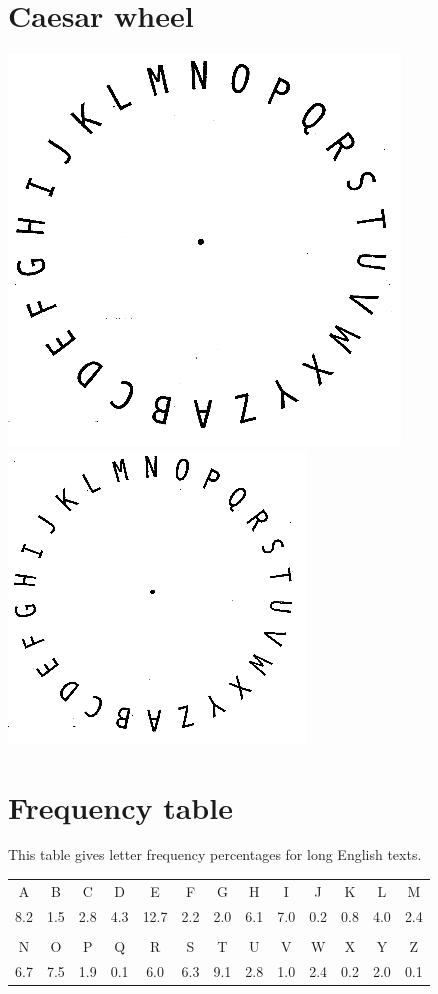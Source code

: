 \documentclass{book}
\theoremstyle{plain}
\theoremstyle{definition}
\begin{document}
\chapter{Caesar wheel}
\label{app:wheel}
\begin{center}
\includegraphics{caesar_large.png}
\includegraphics{caesar_small.png}
\end{center}

\chapter{Frequency table}
\label{app:frequencies}
This table gives letter frequency percentages for long English texts.

\begin{center}
\begin{tabular}{ccccccccccccc}
A & B & C & D & E & F & G & H & I & J & K & L & M \\
8.2 & 1.5 & 2.8 & 4.3 & 12.7 & 2.2 & 2.0 & 6.1 & 7.0 & 0.2 & 0.8 & 4.0 & 2.4 \\
\\
N & O & P & Q & R & S & T & U & V & W & X & Y & Z \\
6.7 & 7.5 & 1.9 & 0.1 & 6.0 & 6.3 & 9.1 & 2.8 & 1.0 & 2.4 & 0.2 & 2.0 & 0.1
\end{tabular}
\end{center}
\end{document}
